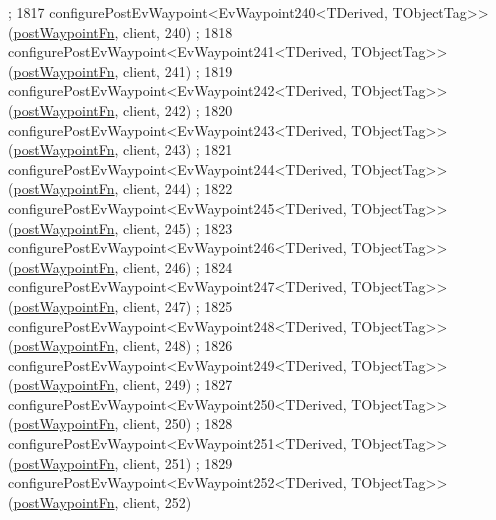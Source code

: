 \begin{DoxyCode}
      ;
1817     configurePostEvWaypoint<EvWaypoint240<TDerived, TObjectTag>>(\hyperlink{classmove__base__z__client_1_1WaypointEventDispatcher_acc538eb7506c13f7cca2268a1742dadd}{postWaypointFn}, client, 240)
      ;
1818     configurePostEvWaypoint<EvWaypoint241<TDerived, TObjectTag>>(\hyperlink{classmove__base__z__client_1_1WaypointEventDispatcher_acc538eb7506c13f7cca2268a1742dadd}{postWaypointFn}, client, 241)
      ;
1819     configurePostEvWaypoint<EvWaypoint242<TDerived, TObjectTag>>(\hyperlink{classmove__base__z__client_1_1WaypointEventDispatcher_acc538eb7506c13f7cca2268a1742dadd}{postWaypointFn}, client, 242)
      ;
1820     configurePostEvWaypoint<EvWaypoint243<TDerived, TObjectTag>>(\hyperlink{classmove__base__z__client_1_1WaypointEventDispatcher_acc538eb7506c13f7cca2268a1742dadd}{postWaypointFn}, client, 243)
      ;
1821     configurePostEvWaypoint<EvWaypoint244<TDerived, TObjectTag>>(\hyperlink{classmove__base__z__client_1_1WaypointEventDispatcher_acc538eb7506c13f7cca2268a1742dadd}{postWaypointFn}, client, 244)
      ;
1822     configurePostEvWaypoint<EvWaypoint245<TDerived, TObjectTag>>(\hyperlink{classmove__base__z__client_1_1WaypointEventDispatcher_acc538eb7506c13f7cca2268a1742dadd}{postWaypointFn}, client, 245)
      ;
1823     configurePostEvWaypoint<EvWaypoint246<TDerived, TObjectTag>>(\hyperlink{classmove__base__z__client_1_1WaypointEventDispatcher_acc538eb7506c13f7cca2268a1742dadd}{postWaypointFn}, client, 246)
      ;
1824     configurePostEvWaypoint<EvWaypoint247<TDerived, TObjectTag>>(\hyperlink{classmove__base__z__client_1_1WaypointEventDispatcher_acc538eb7506c13f7cca2268a1742dadd}{postWaypointFn}, client, 247)
      ;
1825     configurePostEvWaypoint<EvWaypoint248<TDerived, TObjectTag>>(\hyperlink{classmove__base__z__client_1_1WaypointEventDispatcher_acc538eb7506c13f7cca2268a1742dadd}{postWaypointFn}, client, 248)
      ;
1826     configurePostEvWaypoint<EvWaypoint249<TDerived, TObjectTag>>(\hyperlink{classmove__base__z__client_1_1WaypointEventDispatcher_acc538eb7506c13f7cca2268a1742dadd}{postWaypointFn}, client, 249)
      ;
1827     configurePostEvWaypoint<EvWaypoint250<TDerived, TObjectTag>>(\hyperlink{classmove__base__z__client_1_1WaypointEventDispatcher_acc538eb7506c13f7cca2268a1742dadd}{postWaypointFn}, client, 250)
      ;
1828     configurePostEvWaypoint<EvWaypoint251<TDerived, TObjectTag>>(\hyperlink{classmove__base__z__client_1_1WaypointEventDispatcher_acc538eb7506c13f7cca2268a1742dadd}{postWaypointFn}, client, 251)
      ;
1829     configurePostEvWaypoint<EvWaypoint252<TDerived, TObjectTag>>(\hyperlink{classmove__base__z__client_1_1WaypointEventDispatcher_acc538eb7506c13f7cca2268a1742dadd}{postWaypointFn}, client, 252)

\end{DoxyCode}
